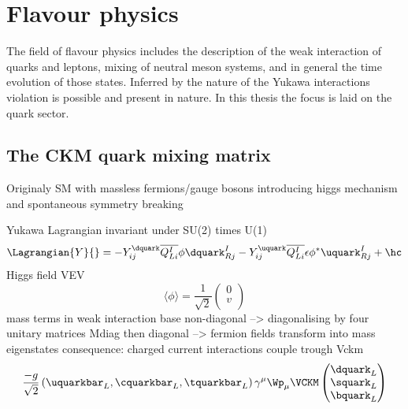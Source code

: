 
\section{Flavour physics}
\label{sec:cpv_theory:flavour_physics}

The field of flavour physics includes the description of the weak interaction of
quarks and leptons, mixing of neutral meson systems, and in general the time
evolution of those states. Inferred by the nature of the Yukawa interactions \CP
violation is possible and present in nature. In this thesis the focus is laid on
the quark sector.

\subsection{The \acs*{CKM} quark mixing matrix}
\label{sec:cpv_theory:flavour_physics:ckm_matrix}

Originaly SM with massless fermions/gauge bosons
introducing higgs mechanism and spontaneous symmetry breaking

Yukawa Lagrangian invariant under SU(2) times U(1)
%
\begin{equation}
  \Lagrangian{Y}{} = -Y_{ij}^{\dquark} \overline{Q_{Li}^{I}} \phi \dquark_{Rj}^{I} - Y_{ij}^{\uquark} \overline{Q_{Li}^{I}} \epsilon \phi^{*} \uquark_{Rj}^{I} + \hc
\end{equation}
%
Higgs field VEV
%
\begin{equation}
  \langle\phi\rangle = \frac{1}{\sqrt{2}} \begin{pmatrix}
    0 \\
    v \\
  \end{pmatrix}
\end{equation}
%
mass terms in weak interaction base non-diagonal --> diagonalising by four unitary matrices
Mdiag then diagonal --> fermion fields transform into mass eigenstates
consequence: charged current interactions couple trough Vckm
%
\begin{equation}
  \frac{-g}{\sqrt{2}} \left( \uquarkbar_L, \cquarkbar_L, \tquarkbar_L \right) \gamma^\mu \Wp_\mu \VCKM 
  \begin{pmatrix}
    \dquark_L \\
    \squark_L \\
    \bquark_L \\
  \end{pmatrix}
\end{equation}
%

